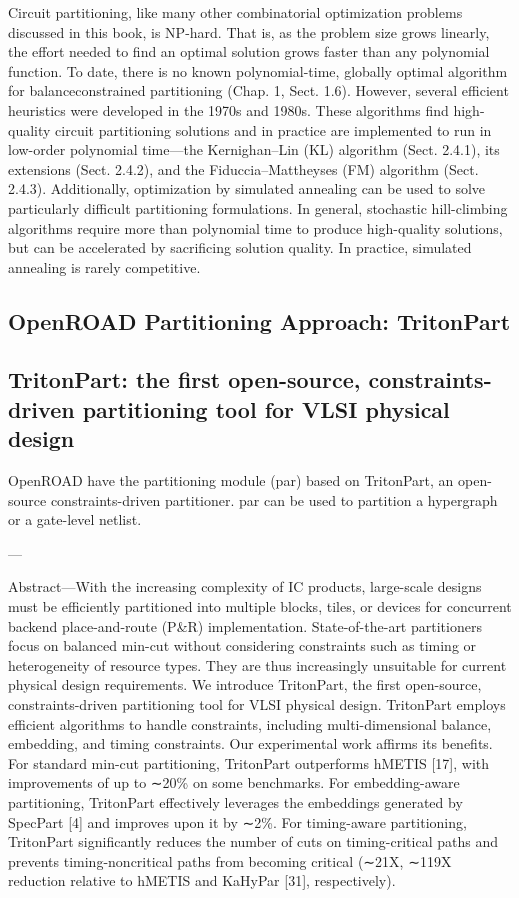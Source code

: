 Circuit partitioning, like many other combinatorial optimization problems discussed in this book, is NP-hard. That is, as the problem size grows linearly, the effort needed to find an optimal solution grows faster than any polynomial function. To date, there is no known polynomial-time, globally optimal algorithm for balanceconstrained partitioning (Chap. 1, Sect. 1.6). However, several efficient heuristics were developed in the 1970s and 1980s. These algorithms find high-quality circuit partitioning solutions and in practice are implemented to run in low-order polynomial time—the Kernighan–Lin (KL) algorithm (Sect. 2.4.1), its extensions (Sect. 2.4.2), and the Fiduccia–Mattheyses (FM) algorithm (Sect. 2.4.3). Additionally, optimization by simulated annealing can be used to solve particularly difficult partitioning formulations. In general, stochastic hill-climbing algorithms require more than polynomial time to produce high-quality solutions, but can be accelerated by sacrificing solution quality. In practice, simulated annealing is rarely competitive.

\subsection{OpenROAD Partitioning Approach: TritonPart}
\subsection{TritonPart: the first open-source, constraints-driven partitioning tool for VLSI physical design}

OpenROAD have the partitioning module (par) based on TritonPart, an open-source constraints-driven partitioner. par can be used to partition a hypergraph or a gate-level netlist.


---

Abstract—With the increasing complexity of IC products, large-scale designs must be efficiently partitioned into multiple blocks, tiles, or devices for concurrent backend place-and-route (P&R) implementation. State-of-the-art partitioners focus on balanced min-cut without considering constraints such as timing or heterogeneity of resource types. They are thus increasingly unsuitable for current physical design requirements. We introduce TritonPart, the first open-source, constraints-driven partitioning tool for VLSI physical design. TritonPart employs efficient algorithms to handle constraints, including multi-dimensional balance, embedding, and timing constraints. Our experimental work affirms its benefits. For standard min-cut partitioning, TritonPart outperforms hMETIS [17], with improvements of up to ∼20\% on some benchmarks. For embedding-aware partitioning, TritonPart effectively leverages the embeddings generated by SpecPart [4] and improves upon it by ∼2\%. For timing-aware partitioning, TritonPart significantly reduces the number of cuts on timing-critical paths and prevents timing-noncritical paths from becoming critical (∼21X, ∼119X reduction relative to hMETIS and KaHyPar [31], respectively).

